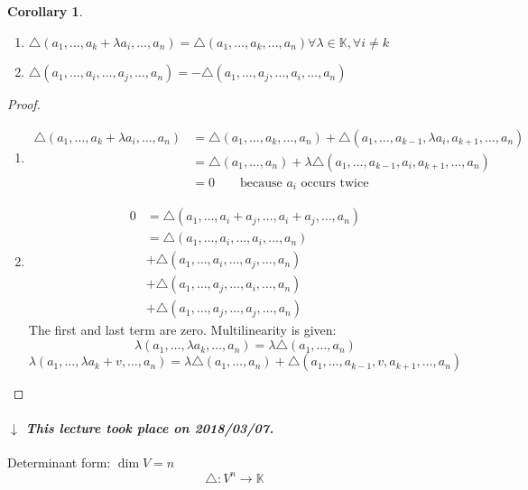 \documentclass{article}
\newcounter{lecref}[section]
\numberwithin{lecref}{section}
\newtheorem{corollary}[lecref]{Corollary}
\newcommand{\dateref}[1]{%
  \begin{mdframed}[backgroundcolor=gray!10,innerbottommargin=0pt,innertopmargin=0pt]
    \paragraph{\textit{$\downarrow$ This lecture took place on #1.}}%
  \end{mdframed}%
}
\begin{document}
\begin{corollary} %
  \begin{enumerate}
    \item[4.]
      $\triangle(a_1, \dots, a_k + \lambda a_i, \dots, a_n) = \triangle(a_1, \dots, a_k, \dots, a_n) \forall \lambda \in \mathbb K, \forall i \neq k$
    \item[5.]
      $\triangle(a_1, \dots, a_i, \dots, a_j, \dots, a_n) = -\triangle(a_1, \dots, a_j, \dots, a_i, \dots, a_n)$
  \end{enumerate}
\end{corollary}
\begin{proof}
  \begin{enumerate}
    \item
      \begin{align*}
        \triangle(a_1, \dots, a_k + \lambda a_i, \dots, a_n)
          &= \triangle (a_1, \dots, a_k, \dots, a_n) + \triangle (a_1, \dots, a_{k-1}, \lambda a_i, a_{k+1}, \dots, a_n) \\
          &= \triangle (a_1, \dots, a_n) + \lambda \triangle (a_1, \dots, a_{k-1}, a_i, a_{k+1}, \dots, a_n) \\
          &= 0 \qquad \text{because $a_i$ occurs twice}
      \end{align*}
    \item
      \begin{align*}
        0 &= \triangle(a_1, \dots, a_i + a_j, \dots, a_i + a_j, \dots, a_n) \\
          &= \triangle(a_1, \dots, a_i, \dots, a_i, \dots, a_n) \\
          &+ \triangle(a_1, \dots, a_i, \dots, a_j, \dots, a_n) \\
          &+ \triangle(a_1, \dots, a_j, \dots, a_i, \dots, a_n) \\
          &+ \triangle(a_1, \dots, a_j, \dots, a_j, \dots, a_n)
      \end{align*}
      The first and last term are zero. Multilinearity is given:
      \[ \lambda(a_1, \dots, \lambda a_k, \dots, a_n) = \lambda \triangle (a_1, \dots, a_n) \]
      \[ \lambda(a_1, \dots, \lambda a_k + v, \dots, a_n) = \lambda \triangle (a_1, \dots, a_n) + \triangle (a_1, \dots, a_{k-1}, v, a_{k+1}, \dots, a_n) \]
  \end{enumerate}
\end{proof}

\dateref{2018/03/07}

Determinant form: $\dim{V} = n$
\[ \triangle: V^n \to \mathbb K \]
\end{document}
